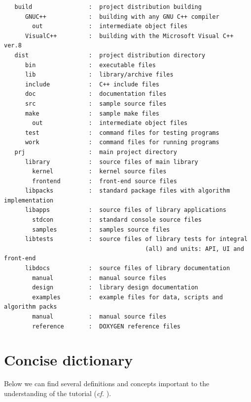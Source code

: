 \documentclass[a4paper,fleqn]{report}
\newcounter{leaves}
\newcounter{directories}
\newenvironment{directory}[2][\linewidth]%
{%
\setcounter{leaves}{0}%
\addtocounter{directories}{1}
\edef\directoryname{D\thedirectories}
\begin{minipage}[t]{#1}%
  \setlength{\parindent}{\linewidth}
  \addtolength{\parindent}{-\dirshrink\parindent}
  \parskip0pt%
  \noindent
  \Rnode[href=-\dirshrink]{\directoryname}{\parbox[t]{#1}{#2}}%
  \par
}
{\end{minipage}}
\newcommand{\dirshrink}{.95}
\begin{document}
\begin{scriptsize}
 \begin{verbatim}
   build                :  project distribution building
      GNUC++            :  building with any GNU C++ compiler
        out             :  intermediate object files
      VisualC++         :  building with the Microsoft Visual C++ ver.8
   dist                 :  project distribution directory
      bin               :  executable files
      lib               :  library/archive files
      include           :  C++ include files
      doc               :  documentation files
      src               :  sample source files
      make              :  sample make files
        out             :  intermediate object files
      test              :  command files for testing programs
      work              :  command files for running programs
   prj                  :  main project directory
      library           :  source files of main library
        kernel          :  kernel source files
        frontend        :  front-end source files
      libpacks          :  standard package files with algorithm implementation
      libapps           :  source files of library applications
        stdcon          :  standard console source files
        samples         :  samples source files
      libtests          :  source files of library tests for integral 
                                        (all) and units: API, UI and front-end
      libdocs           :  source files of library documentation
        manual          :  manual source files
        design          :  library design documentation
        examples        :  example files for data, scripts and algorithm packs
        manual          :  manual source files
        reference       :  DOXYGEN reference files
 \end{verbatim}
\end{scriptsize}

%


\chapter{Concise dictionary} \label{sec:InfoselDefintion}

Below we can find several definitions and concepts important to the understanding of the tutorial ({\it cf.} \cite{HuanLiu2004}). 
\end{document}
